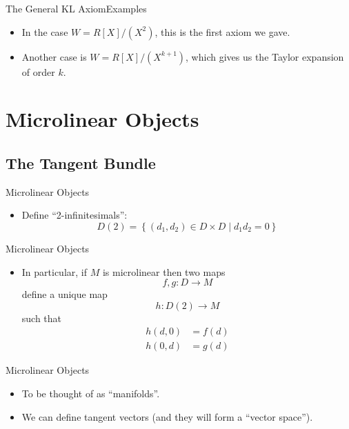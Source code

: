 \documentclass{beamer}
\begin{document}
\begin{frame}{The General KL Axiom}{Examples}
  \begin{itemize}
    \item In the case \( W=R[X]/(X^2) \), this is the first axiom we gave.
    \item Another case is \( W=R[X]/(X^{k+1})\), which gives us the Taylor
      expansion of order \( k \).
  \end{itemize}
\end{frame}

\section{Microlinear Objects}

\subsection{The Tangent Bundle}


\begin{frame}{Microlinear Objects}
  \begin{itemize}
    \item Define ``2-infinitesimals'':
      \begin{equation*}
        D(2) =  \left\{(d_1,d_2)\in D\times D \mid d_1d_2 = 0\right\}
      \end{equation*}
  \end{itemize}
\end{frame}

\begin{frame}{Microlinear Objects}

\begin{itemize}
  \item In particular, if \( M \) is microlinear then two maps
    \begin{equation*}
      f,g:D\to M
    \end{equation*}
    define a unique map
    \begin{equation*}
      h:D(2)\to M
    \end{equation*}
    such that 
    \begin{align*}
      h(d,0) &= f(d)\\
      h(0,d) &= g(d)
    \end{align*}
\end{itemize}

\end{frame}

\begin{frame}{Microlinear Objects}

\begin{itemize}
  \item To be thought of as ``manifolds''.
  \item We can define tangent vectors (and they will form a ``vector space'').
\end{itemize}

\end{frame}
\end{document}
